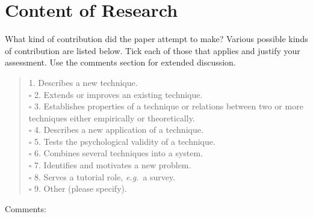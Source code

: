 \documentclass{article}
\begin{document}
\section{Content of Research}
{\small What kind of contribution did the paper attempt to make?
Various possible kinds of contribution are listed below.  Tick
each of those that applies and justify your assessment. Use the
comments section for extended discussion.}
\begin{verse}



\makebox[0pt][l]{$\square$}\raisebox{.15ex}{\hspace{0.1em}$\checkmark$}
1. Describes a new technique.  \\
$\square$
2. Extends or improves an existing technique.  \\
$\square$
3. Establishes properties of a technique or relations between two
or more techniques either empirically or theoretically.  \\
$\square$
4. Describes a new application of a technique.  \\
$\square$
5. Tests the psychological validity of a technique.  \\
$\square$
6. Combines several techniques into a system.  \\
$\square$
7. Identifies and motivates a new problem.  \\
$\square$
8. Serves a tutorial role, {\em e.g.}~a survey.  \\
$\square$
9. Other (please specify).  \\
\end{verse}
Comments: \\
\end{document}
